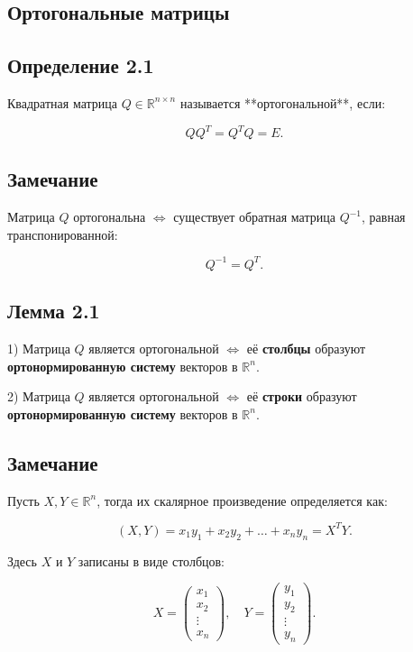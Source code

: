{
\subsection{Ортогональные матрицы}

\subsection*{Определение 2.1}

Квадратная матрица \( Q \in \mathbb{R}^{n \times n} \) называется **ортогональной**, если:



\[
Q Q^{T} = Q^{T} Q = E.
\]



\subsection*{Замечание}

Матрица \( Q \) ортогональна \( \iff \) существует обратная матрица \( Q^{-1} \), равная транспонированной:



\[
Q^{-1} = Q^{T}.
\]



\subsection*{Лемма 2.1}

1) Матрица \( Q \) является ортогональной \( \iff \) её \textbf{столбцы} образуют \textbf{ортонормированную систему} векторов в \( \mathbb{R}^{n} \).

2) Матрица \( Q \) является ортогональной \( \iff \) её \textbf{строки} образуют \textbf{ортонормированную систему} векторов в \( \mathbb{R}^{n} \).

\subsection*{Замечание }

Пусть \( X, Y \in \mathbb{R}^n \), тогда их скалярное произведение определяется как:



\[
(X, Y) = x_1 y_1 + x_2 y_2 + \dots + x_n y_n = X^T Y.
\]



Здесь \( X \) и \( Y \) записаны в виде столбцов:



\[
X = \begin{pmatrix} x_1 \\ x_2 \\ \vdots \\ x_n \end{pmatrix}, \quad Y = \begin{pmatrix} y_1 \\ y_2 \\ \vdots \\ y_n \end{pmatrix}.
\]




}
